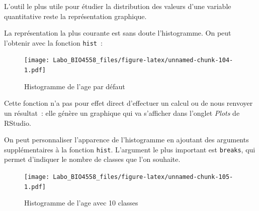 \documentclass[12pt,]{book}
\newenvironment{Shaded}{\begin{snugshade}}{\end{snugshade}}
\newcommand{\DataTypeTok}[1]{\textcolor[rgb]{0.13,0.29,0.53}{#1}}
\newcommand{\DecValTok}[1]{\textcolor[rgb]{0.00,0.00,0.81}{#1}}
\newcommand{\KeywordTok}[1]{\textcolor[rgb]{0.13,0.29,0.53}{\textbf{#1}}}
\newcommand{\NormalTok}[1]{#1}
\newcommand{\OperatorTok}[1]{\textcolor[rgb]{0.81,0.36,0.00}{\textbf{#1}}}
\newcommand{\StringTok}[1]{\textcolor[rgb]{0.31,0.60,0.02}{#1}}
\begin{document}
L'outil le plus utile pour étudier la distribution des valeurs d'une variable quantitative reste la représentation graphique.

La représentation la plus courante est sans doute l'histogramme. On peut l'obtenir avec la fonction \texttt{hist}~:

\begin{Shaded}
\end{Shaded}

\begin{figure}
\centering
\texttt{[image: Labo\_BIO4558\_files/figure-latex/unnamed-chunk-104-1.pdf]}
\caption{\label{fig:unnamed-chunk-104}Histogramme de l'age par défaut}
\end{figure}

Cette fonction n'a pas pour effet direct d'effectuer un calcul ou de nous renvoyer un résultat~: elle génère un graphique qui va s'afficher dans l'onglet \emph{Plots} de RStudio.

On peut personnaliser l'apparence de l'histogramme en ajoutant des arguments supplémentaires à la fonction \texttt{hist}. L'argument le plus important est \texttt{breaks}, qui permet d'indiquer le nombre de classes que l'on souhaite.

\begin{Shaded}
\end{Shaded}

\begin{figure}
\centering
\texttt{[image: Labo\_BIO4558\_files/figure-latex/unnamed-chunk-105-1.pdf]}
\caption{\label{fig:unnamed-chunk-105}Histogramme de l'age avec 10 classes}
\end{figure}

\begin{Shaded}
\end{Shaded}
\end{document}
